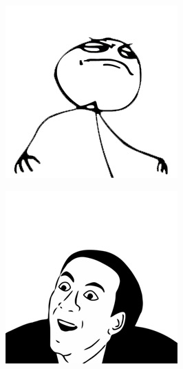 \begin{multicols}{8}
\begin{center}
\includegraphics[width=\linewidth]{./IMG-GIT/MEMES/Meme-troll-Chulo.jpg}
\end{center}

\begin{center}
\includegraphics[width=\linewidth]{./IMG-GIT/MEMES/Meme-face-Nicolas-Cage.jpg}   
\end{center}


\end{multicols}

